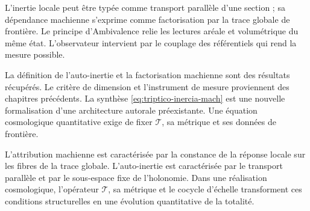 \begin{resultbox}
L'inertie locale peut être typée comme transport parallèle d'une section ; sa
dépendance machienne s'exprime comme factorisation par la trace globale de
frontière. Le principe d'Ambivalence relie les lectures aréale et volumétrique
du même état. L'observateur intervient par le couplage des référentiels qui
rend la mesure possible.
\end{resultbox}

\begin{statusbox}
La définition de l'auto-inertie et la factorisation machienne sont des résultats
récupérés. Le critère de dimension et l'instrument de mesure proviennent des
chapitres précédents. La synthèse \eqref{eq:triptico-inercia-mach} est une
nouvelle formalisation d'une architecture autorale préexistante. Une équation
cosmologique quantitative exige de fixer \(\mathcal T\), sa métrique et ses données
de frontière.
\end{statusbox}

L'attribution machienne est caractérisée par la constance de la réponse
locale sur les fibres de la trace globale. L'auto-inertie est caractérisée
par le transport parallèle et par le sous-espace fixe de l'holonomie. Dans une
réalisation cosmologique, l'opérateur \(\mathcal T\), sa métrique et le cocycle
d'échelle transforment ces conditions structurelles en une évolution
quantitative de la totalité.
